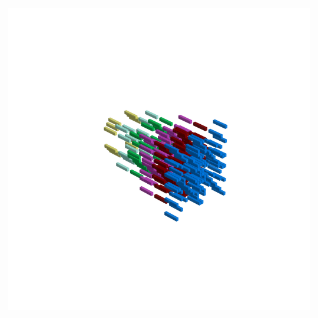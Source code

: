 \begin{minipage}[b]{0.50\linewidth}
\begin{figure}[H]
        \vspace*{-8cm}
        \hspace*{2cm}
        \includegraphics[width=8cm]{src/symmetries/pattern5_4-45.png}
        \vspace*{-2.5cm}
  \caption*{}
  \end{figure}
\end{minipage}
\clearpage
\hspace{-1cm}
